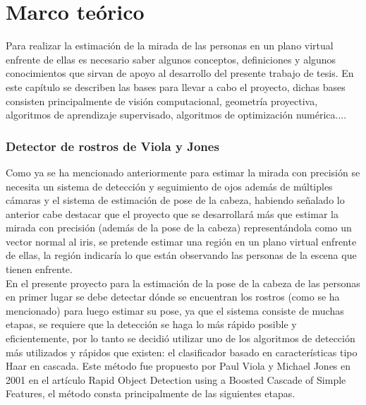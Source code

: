 \chapter{Marco teórico}

	Para realizar la estimación de la mirada de las personas en un plano virtual enfrente de ellas es necesario saber algunos conceptos, definiciones y algunos conocimientos que sirvan de apoyo al desarrollo del presente trabajo de tesis. En este capítulo se describen las bases para llevar a cabo el proyecto, dichas bases consisten principalmente de visión computacional, geometría proyectiva, algoritmos de aprendizaje supervisado, algoritmos de optimización numérica....


   
   \subsection{Detector de rostros de Viola y Jones}
  Como ya se ha mencionado anteriormente para estimar la mirada con precisión se necesita un sistema de detección y seguimiento de ojos además de múltiples cámaras y el sistema de estimación de pose de la cabeza, habiendo señalado lo anterior cabe destacar que el proyecto que se desarrollará más que estimar la mirada con precisión (además de la pose de la cabeza) representándola como un vector normal al iris,  se pretende estimar una región en un plano virtual enfrente de ellas, la región indicaría lo que están observando las personas de la escena que tienen enfrente. \\
   
   En el presente proyecto para la estimación de la pose de la cabeza de las personas en primer lugar se debe detectar dónde se encuentran los rostros (como se ha mencionado) para luego estimar su pose, ya que el sistema consiste de muchas etapas, se requiere que la detección se haga lo más rápido posible y eficientemente,  por lo tanto se decidió utilizar uno de los algoritmos de detección más utilizados y rápidos que existen: el clasificador basado en características tipo Haar en cascada. Este método fue propuesto por Paul Viola y Michael Jones en 2001 en el artículo Rapid Object Detection using a Boosted Cascade of Simple Features, el método consta principalmente de las siguientes etapas.
   

